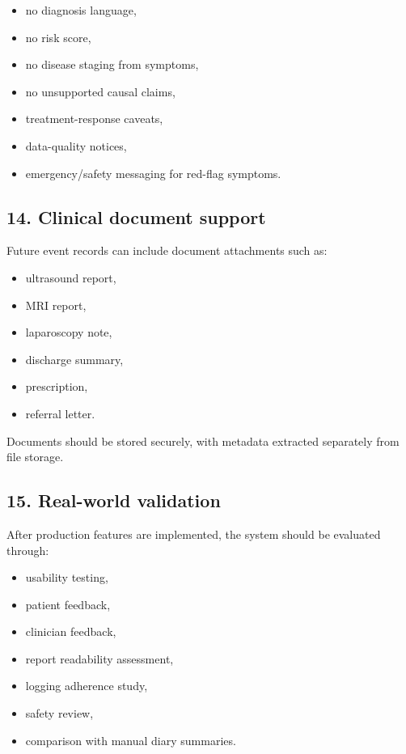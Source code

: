 \documentclass[11pt,a4paper]{article}
\begin{document}
\begin{itemize}
  \item no diagnosis language,
  \item no risk score,
  \item no disease staging from symptoms,
  \item no unsupported causal claims,
  \item treatment-response caveats,
  \item data-quality notices,
  \item emergency/safety messaging for red-flag symptoms.
\end{itemize}

\subsection{14. Clinical document support}

Future event records can include document attachments such as:

\begin{itemize}
  \item ultrasound report,
  \item MRI report,
  \item laparoscopy note,
  \item discharge summary,
  \item prescription,
  \item referral letter.
\end{itemize}

Documents should be stored securely, with metadata extracted separately from file storage.

\subsection{15. Real-world validation}

After production features are implemented, the system should be evaluated through:

\begin{itemize}
  \item usability testing,
  \item patient feedback,
  \item clinician feedback,
  \item report readability assessment,
  \item logging adherence study,
  \item safety review,
  \item comparison with manual diary summaries.
\end{itemize}
\end{document}
